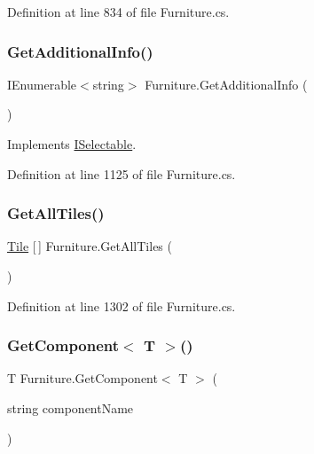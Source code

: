 Definition at line 834 of file Furniture.\+cs.

\mbox{\label{class_furniture_a0834aab5c42424b7c700feeac78a8cc5}} 
\subsubsection{\texorpdfstring{Get\+Additional\+Info()}{GetAdditionalInfo()}}
{\footnotesize\ttfamily I\+Enumerable$<$string$>$ Furniture.\+Get\+Additional\+Info (\begin{DoxyParamCaption}{ }\end{DoxyParamCaption})}



Implements \hyperlink{interface_i_selectable_a337f81bfa99bb254bb2f7de6a8b5cd4b}{I\+Selectable}.



Definition at line 1125 of file Furniture.\+cs.

\mbox{\label{class_furniture_a80906e15f092dd5b46c60b4b973dd36f}} 
\subsubsection{\texorpdfstring{Get\+All\+Tiles()}{GetAllTiles()}}
{\footnotesize\ttfamily \hyperlink{class_tile}{Tile} \mbox{[}$\,$\mbox{]} Furniture.\+Get\+All\+Tiles (\begin{DoxyParamCaption}{ }\end{DoxyParamCaption})}



Definition at line 1302 of file Furniture.\+cs.

\mbox{\label{class_furniture_adfea45b46ac394267dbd99b8ee521728}} 
\subsubsection{\texorpdfstring{Get\+Component$<$ T $>$()}{GetComponent< T >()}}
{\footnotesize\ttfamily T Furniture.\+Get\+Component$<$ T $>$ (\begin{DoxyParamCaption}\item[{string}]{component\+Name }\end{DoxyParamCaption})}




